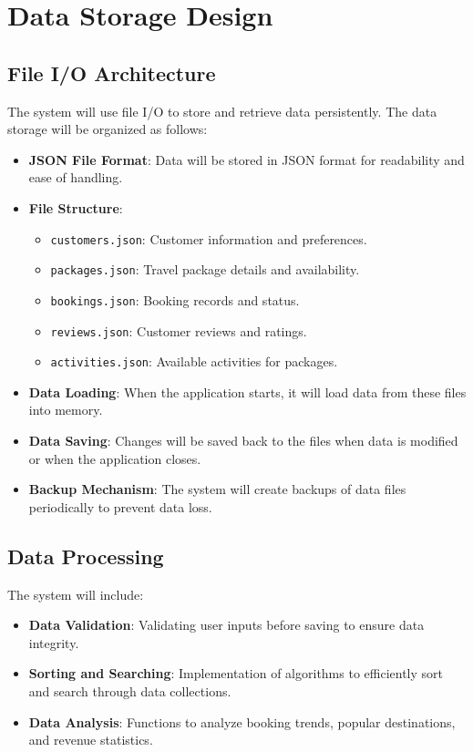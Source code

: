 \documentclass[12pt]{article}
\begin{document}
\section{Data Storage Design}

\subsection{File I/O Architecture}
The system will use file I/O to store and retrieve data persistently. The data storage will be organized as follows:

\begin{itemize}
    \item \textbf{JSON File Format}: Data will be stored in JSON format for readability and ease of handling.
    
    \item \textbf{File Structure}:
    \begin{itemize}
        \item \texttt{customers.json}: Customer information and preferences.
        \item \texttt{packages.json}: Travel package details and availability.
        \item \texttt{bookings.json}: Booking records and status.
        \item \texttt{reviews.json}: Customer reviews and ratings.
        \item \texttt{activities.json}: Available activities for packages.
    \end{itemize}
    
    \item \textbf{Data Loading}: When the application starts, it will load data from these files into memory.
    
    \item \textbf{Data Saving}: Changes will be saved back to the files when data is modified or when the application closes.
    
    \item \textbf{Backup Mechanism}: The system will create backups of data files periodically to prevent data loss.
\end{itemize}

\subsection{Data Processing}
The system will include:

\begin{itemize}
    \item \textbf{Data Validation}: Validating user inputs before saving to ensure data integrity.
    
    \item \textbf{Sorting and Searching}: Implementation of algorithms to efficiently sort and search through data collections.
    
    \item \textbf{Data Analysis}: Functions to analyze booking trends, popular destinations, and revenue statistics.
\end{itemize}
\end{document}
